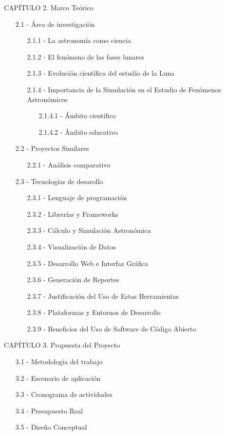 \vspace{1em}
CAPÍTULO 2. Marco Teórico
\begin{enumerate}
  \item[2.1 -] Área de investigación
  \begin{enumerate}
    \item[2.1.1 -] La astronomía como ciencia
    \item[2.1.2 -] El fenómeno de las fases lunares
    \item[2.1.3 -] Evolución científica del estudio de la Luna
    \item[2.1.4 -] Importancia de la Simulación en el Estudio de Fenómenos Astronómicos
    \begin{enumerate}
      \item[2.1.4.1 -] Ámbito científico
      \item[2.1.4.2 -] Ámbito educativo
    \end{enumerate}
  \end{enumerate}
  \item[2.2 -] Proyectos Similares
  \begin{enumerate}
    \item[2.2.1 -] Análisis comparativo
  \end{enumerate}
  \item[2.3 -] Tecnologías de desarollo
  \begin{enumerate}
    \item[2.3.1 -] Lenguaje de programación
    \item[2.3.2 -] Librerías y Frameworks
    \item[2.3.3 -] Cálculo y Simulación Astronómica
    \item[2.3.4 -] Visualización de Datos
    \item[2.3.5 -] Desarrollo Web e Interfaz Gráfica
    \item[2.3.6 -] Generación de Reportes
    \item[2.3.7 -] Justificación del Uso de Estas Herramientas
    \item[2.3.8 -] Plataformas y Entornos de Desarrollo
    \item[2.3.9 -] Beneficios del Uso de Software de Código Abierto   
  \end{enumerate}
\end{enumerate}

\vspace{1em}
CAPÍTULO 3. Propuesta del Proyecto
\begin{enumerate}
  \item[3.1 -] Metodología del trabajo
  \item[3.2 -] Escenario de aplicación
  \item[3.3 -] Cronograma de actividades
  \item[3.4 -] Presupuesto Real
  \item[3.5 -] Diseño Conceptual
\end{enumerate}

